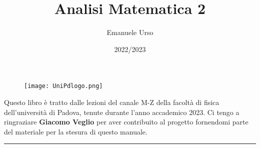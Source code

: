 \documentclass[a4paper]{article}
\begin{document}
	

	
	\title{\Huge Analisi Matematica 2}
	\author{{\Large Emanuele Urso} \\
	{\small{\href{mailto:emanuele.urso@studenti.unipd.it}{\color{black}{emanuele.urso@studenti.unipd.it} }}}}
	\date{2022/2023}
	\maketitle
	
	\begin{figure}[!h]
		\centering
		\texttt{[image: UniPdlogo.png]}
	\end{figure}
	
	\vfill
	
	Questo libro è tratto dalle lezioni del canale M-Z della facoltà di fisica dell'università di Padova, tenute durante l'anno accademico 2023. Ci tengo a ringraziare \textbf{Giacomo Veglio} per aver contribuito al progetto fornendomi parte del materiale per la stesura di questo manuale.
	
	\vspace{10em}
	
	
	\begin{center}
		\rule{.9\textwidth}{0.4pt}%
	\end{center}
	
	\hypersetup{linkcolor=black}
	\tableofcontents   
	
\newpage


\end{document}
